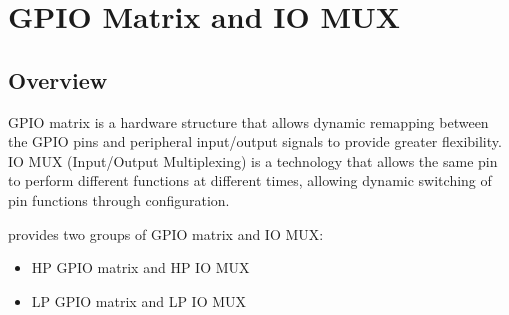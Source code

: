 \documentclass[main\_\_EN.tex]{subfiles}
\begin{document}

\ifglobal
\else
    \listoftodos
    {\let\clearpage\relax \listofdonetodos}
    \tableofcontents
\fi



\hypertarget{iomuxgpio}{}
\chapter{GPIO Matrix and IO MUX}
\label{mod:iomuxgpio}


\section{Overview}
GPIO matrix is a hardware structure that allows dynamic remapping between the GPIO pins and peripheral input/output signals to provide greater flexibility. IO MUX (Input/Output Multiplexing) is a technology that allows the same pin to perform different functions at different times, allowing dynamic switching of pin functions through configuration.

\chipname{} provides two groups of GPIO matrix and IO MUX:
\begin{itemize}
    \item HP GPIO matrix and HP IO MUX
    \item LP GPIO matrix and LP IO MUX
\end{itemize}
\end{document}
